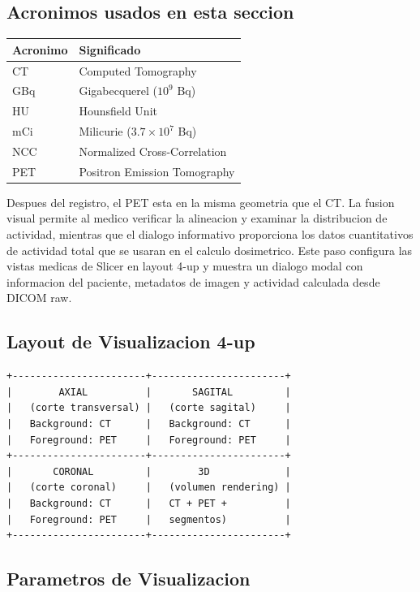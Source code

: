 \documentclass[12pt,a4paper]{article}
\begin{document}
\subsection*{Acronimos usados en esta seccion}
\begin{tabular}{ll}
\toprule
\textbf{Acronimo} & \textbf{Significado} \\
\midrule
CT & Computed Tomography \\
GBq & Gigabecquerel ($10^9$ Bq) \\
HU & Hounsfield Unit \\
mCi & Milicurie ($3.7 \times 10^7$ Bq) \\
NCC & Normalized Cross-Correlation \\
PET & Positron Emission Tomography \\
\bottomrule
\end{tabular}

Despues del registro, el PET esta en la misma geometria que el CT. La fusion visual permite al
medico verificar la alineacion y examinar la distribucion de actividad, mientras que el dialogo
informativo proporciona los datos cuantitativos de actividad total que se usaran en el calculo
dosimetrico. Este paso configura las vistas medicas de Slicer en layout 4-up y muestra un dialogo
modal con informacion del paciente, metadatos de imagen y actividad calculada desde DICOM raw.

\subsection{Layout de Visualizacion 4-up}

\begin{verbatim}
+-----------------------+-----------------------+
|        AXIAL          |       SAGITAL         |
|   (corte transversal) |   (corte sagital)     |
|   Background: CT      |   Background: CT      |
|   Foreground: PET     |   Foreground: PET     |
+-----------------------+-----------------------+
|       CORONAL         |        3D             |
|   (corte coronal)     |   (volumen rendering) |
|   Background: CT      |   CT + PET +          |
|   Foreground: PET     |   segmentos)          |
+-----------------------+-----------------------+
\end{verbatim}

\subsection{Parametros de Visualizacion}
\end{document}
